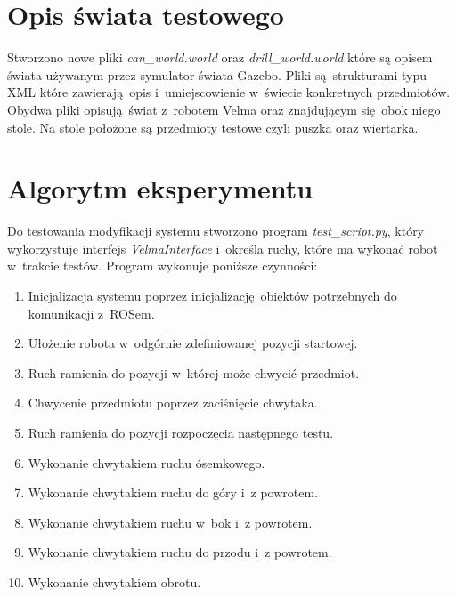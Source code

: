 \section{Opis świata testowego}
Stworzono nowe pliki \textit{can\_world.world} oraz \textit{drill\_world.world} które są opisem świata używanym przez symulator świata Gazebo. Pliki są strukturami typu XML które zawierają opis i~umiejscowienie w~świecie konkretnych przedmiotów. Obydwa pliki opisują świat z~robotem Velma oraz znajdującym się obok niego stole. Na stole położone są przedmioty testowe czyli puszka oraz wiertarka.

\section{Algorytm eksperymentu}
Do testowania modyfikacji systemu stworzono program \textit{test\_script.py}, który wykorzystuje interfejs \textit{VelmaInterface} i~określa ruchy, które ma wykonać robot w~trakcie testów. Program wykonuje poniższe czynności:
\begin{enumerate}
	\item Inicjalizacja systemu poprzez inicjalizację obiektów potrzebnych do komunikacji z~ROSem.
	\item Ułożenie robota w~odgórnie zdefiniowanej pozycji startowej.
	\item Ruch ramienia do pozycji w~której może chwycić przedmiot.
	\item Chwycenie przedmiotu poprzez zaciśnięcie chwytaka.
	\item Ruch ramienia do pozycji rozpoczęcia następnego testu.
	\item Wykonanie chwytakiem ruchu ósemkowego.
	\item Wykonanie chwytakiem ruchu do góry i~z powrotem.
	\item Wykonanie chwytakiem ruchu w~bok i~z powrotem.
	\item Wykonanie chwytakiem ruchu do przodu i~z powrotem.
	\item Wykonanie chwytakiem obrotu. 
\end{enumerate}
